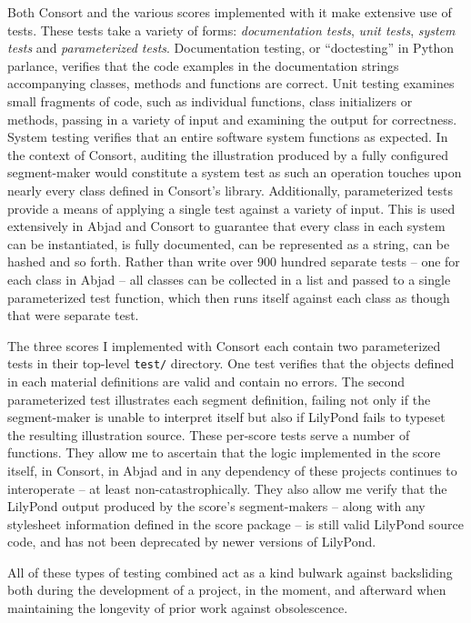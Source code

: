 Both Consort and the various scores implemented with it make extensive use of
tests. These tests take a variety of forms: \emph{documentation tests},
\emph{unit tests}, \emph{system tests} and \emph{parameterized tests}.
Documentation testing, or \enquote{doctesting} in Python parlance, verifies
that the code examples in the documentation strings accompanying classes,
methods and functions are correct. Unit testing examines small fragments of
code, such as individual functions, class initializers or methods, passing in a
variety of input and examining the output for correctness. System testing
verifies that an entire software system functions as expected. In the context
of Consort, auditing the illustration produced by a fully configured
segment-maker would constitute a system test as such an operation touches upon
nearly every class defined in Consort's library. Additionally, parameterized
tests provide a means of applying a single test against a variety of input.
This is used extensively in Abjad and Consort to guarantee that every class in
each system can be instantiated, is fully documented, can be represented as a
string, can be hashed and so forth. Rather than write over 900 hundred separate
tests -- one for each class in Abjad -- all classes can be collected in a list
and passed to a single parameterized test function, which then runs itself
against each class as though that were separate test.

The three scores I implemented with Consort each contain two parameterized
tests in their top-level \texttt{test/} directory. One test verifies that the
objects defined in each material definitions are valid and contain no errors.
The second parameterized test illustrates each segment definition, failing not
only if the segment-maker is unable to interpret itself but also if LilyPond
fails to typeset the resulting illustration source. These per-score tests serve
a number of functions. They allow me to ascertain that the logic implemented in
the score itself, in Consort, in Abjad and in any dependency of these projects
continues to interoperate -- at least non-catastrophically. They also allow me
verify that the LilyPond output produced by the score's segment-makers -- along
with any stylesheet information defined in the score package -- is still valid
LilyPond source code, and has not been deprecated by newer versions of
LilyPond.

All of these types of testing combined act as a kind bulwark against
backsliding both during the development of a project, in the moment, and
afterward when maintaining the longevity of prior work against obsolescence.

